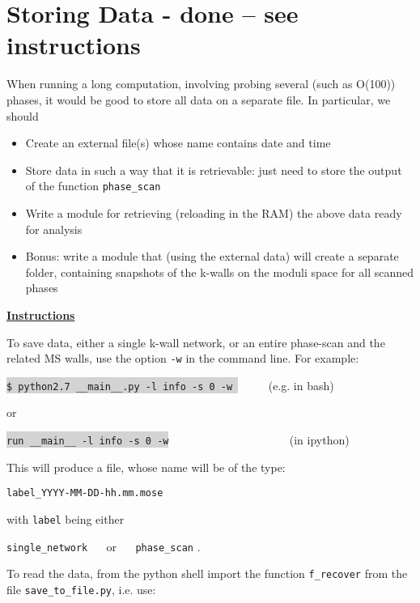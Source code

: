 \documentclass[11pt]{report}
\begin{document}
\section{Storing Data - {\color{red} \bf done -- see instructions}}
When running a long computation, involving probing several (such as O(100)) phases, it would be good to store all data on a separate file.
In particular, we should 
\begin{itemize}
	\item[\checkmark] Create an external file(s) whose name contains date and time
	\item[\checkmark] Store data in such a way that it is retrievable: just need to store the output of the function {\texttt{phase\_scan}}
	\item[\checkmark] Write a module for retrieving (reloading in the RAM) the above data ready for analysis
	\item[\checkmark] Bonus: write a module that (using the external data) will create a separate folder, containing snapshots of the k-walls on the moduli space for all scanned phases
\end{itemize}

\medskip


{\color{red} \bf \Large\underline{Instructions}}

To save data, either a single k-wall network, or an entire phase-scan and the related MS walls, use the option {\tt -w} in the command line. 
For example:

\smallskip

\indent \colorbox{lightgray}{\tt \$ python2.7 \_\_main\_\_.py -l info -s 0 -w } $\qquad$ (e.g. in bash)

\smallskip

or

\smallskip

\indent \colorbox{lightgray}{\tt run \_\_main\_\_ -l info -s 0 -w} $\qquad\qquad\qquad\qquad\qquad$ (in ipython)

\smallskip


This will produce a file, whose name will be of the type:
\begin{center}
{\tt label\_YYYY-MM-DD-hh.mm.mose} 
\end{center}
with {\tt label} being either
\begin{center}
{\tt single\_network} $\quad$ or $\quad$  {\tt phase\_scan} .
\end{center}

To read the data, from the python shell import the function {\tt f\_{recover}} from the file {\tt save\_to\_file.py}, i.e. use:
\end{document}

